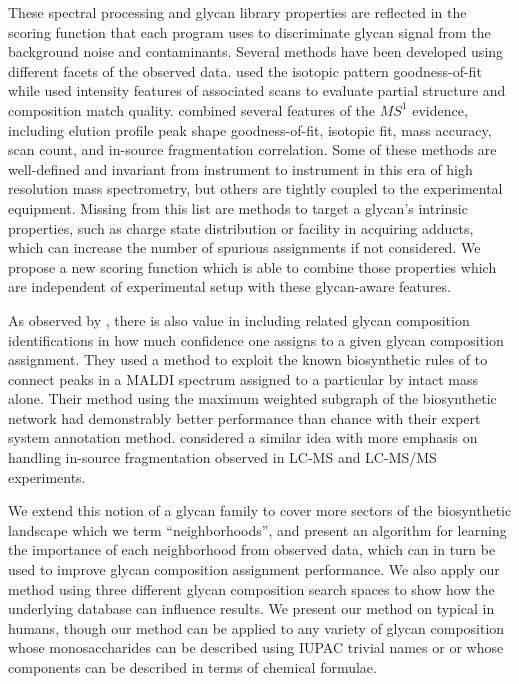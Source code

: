 These spectral processing and glycan library properties are reflected in the
scoring function that each program uses to discriminate glycan signal from
the background noise and contaminants. Several methods have been developed
using different facets of the observed data. \cite{Yu2013} used the isotopic pattern
goodness-of-fit while \cite{Peltoniemi2013} used intensity features of associated \msn
scans to evaluate partial structure and composition match quality. \cite{Kronewitter2014} combined
several features of the $MS^1$ evidence, including elution profile peak shape goodness-of-fit,
isotopic fit, mass accuracy, scan count, and in-source fragmentation correlation. Some of these methods
are well-defined and invariant from instrument to instrument in this era of high resolution
mass spectrometry, but others are tightly coupled to the experimental equipment. Missing from
this list are methods to target a glycan's intrinsic properties, such as charge state distribution
or facility in acquiring adducts, which can increase the number of spurious assignments if not
considered. We propose a new scoring function which is able to combine those properties which
are independent of experimental setup with these glycan-aware features.

As observed by \cite{Goldberg2009}, there is also value in including related glycan
composition identifications in how much confidence one assigns to a given glycan
composition assignment. They used a method to exploit the known biosynthetic rules of
\nglycans to connect peaks in a MALDI spectrum assigned to a particular \nglycan by
intact mass alone. Their method using the maximum weighted subgraph of the biosynthetic
network had demonstrably better performance than chance with their expert system annotation
method. \cite{Kronewitter2014} considered a similar idea with more emphasis on handling
in-source fragmentation observed in LC-MS and LC-MS/MS experiments.

We extend this notion of a glycan family to cover more sectors of the biosynthetic
landscape which we term ``neighborhoods'', and present an algorithm for learning the
importance of each neighborhood from observed data, which can in turn be used to
improve glycan composition assignment performance. We also apply our method using
three different glycan composition search spaces to show how the underlying database
can influence results. We present our method on typical \nglycans in humans, though our
method can be applied to any variety of glycan composition whose monosaccharides can be
described using IUPAC trivial names or or whose components can be described in terms of
chemical formulae.
